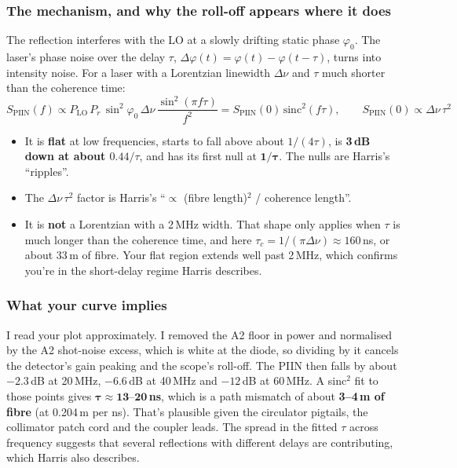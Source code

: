 \begin{tcolorbox}[breakable, colback=gray!4, colframe=gray!50,
	boxrule=0.4pt, arc=2pt, fontupper=\small,
	left=6pt, right=6pt, top=4pt, bottom=4pt]
	\subsubsection*{The mechanism, and why the roll-off appears where it does}
	The reflection interferes with the LO at a slowly drifting static phase $\varphi_0$. The laser's phase noise over the delay $\tau$, $\Delta\varphi(t) = \varphi(t) - \varphi(t-\tau)$, turns into intensity noise. For a laser with a Lorentzian linewidth $\Delta\nu$ and $\tau$ much shorter than the coherence time:
	\[
	S_{\mathrm{PIIN}}(f) \propto P_{\mathrm{LO}}\,P_r\,\sin^2\!\varphi_0\,\Delta\nu\,\frac{\sin^2(\pi f\tau)}{f^2}
	= S_{\mathrm{PIIN}}(0)\,\mathrm{sinc}^2(f\tau),
	\qquad S_{\mathrm{PIIN}}(0) \propto \Delta\nu\,\tau^2
	\]
	\begin{itemize}
		\item It is \textbf{flat} at low frequencies, starts to fall above about $1/(4\tau)$, is \textbf{3\,dB down at about $0.44/\tau$}, and has its first null at $\mathbf{1/\tau}$. The nulls are Harris's ``ripples''.
		\item The $\Delta\nu\,\tau^2$ factor is Harris's ``$\propto$ (fibre length)$^2$ / coherence length''.
		\item It is \textbf{not} a Lorentzian with a 2\,MHz width. That shape only applies when $\tau$ is much longer than the coherence time, and here $\tau_c = 1/(\pi\Delta\nu) \approx 160$\,ns, or about 33\,m of fibre. Your flat region extends well past 2\,MHz, which confirms you're in the short-delay regime Harris describes.
	\end{itemize}
	
	\subsubsection*{What your curve implies}
	I read your plot approximately. I removed the A2 floor in power and normalised by the A2 shot-noise excess, which is white at the diode, so dividing by it cancels the detector's gain peaking and the scope's roll-off. The PIIN then falls by about $-2.3$\,dB at 20\,MHz, $-6.6$\,dB at 40\,MHz and $-12$\,dB at 60\,MHz. A sinc$^2$ fit to those points gives $\boldsymbol{\tau \approx 13\text{--}20}$\,\textbf{ns}, which is a path mismatch of about \textbf{3--4\,m of fibre} (at 0.204\,m per ns). That's plausible given the circulator pigtails, the collimator patch cord and the coupler leads. The spread in the fitted $\tau$ across frequency suggests that several reflections with different delays are contributing, which Harris also describes.
	

\end{tcolorbox}
